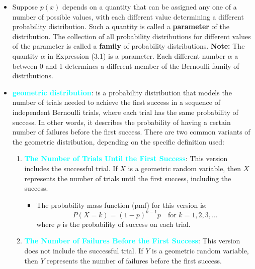 \documentclass{report}
\begin{document}
\begin{itemize}
    \item Suppose $p(x)$ depends on a quantity that can be assigned any one of a number
        of possible values, with each different value determining a different probability distribution. Such a quantity is called a \textbf{parameter} of the distribution. The
        collection of all probability distributions for different values of the parameter
        is called a \textbf{family} of probability distributions.
        \bigbreak \noindent 
        \textbf{Note:} The quantity $\alpha$ in Expression (3.1) is a parameter. Each different number $\alpha$ a between 0 and 1 determines a different member of the Bernoulli family of distributions.
    \item \textbf{\textcolor{cyan}{geometric distribution}}: is a probability distribution that models the number of trials needed to achieve the first success in a sequence of independent Bernoulli trials, where each trial has the same probability of success. In other words, it describes the probability of having a certain number of failures before the first success.
        \bigbreak \noindent 
        There are two common variants of the geometric distribution, depending on the specific definition used:
        \begin{enumerate}
            \item \textbf{\textcolor{cyan}{The Number of Trials Until the First Success}}: This version includes the successful trial. If \( X \) is a geometric random variable, then \( X \) represents the number of trials until the first success, including the success.

                \begin{itemize}
                    \item The probability mass function (pmf) for this version is:
                        \[
                            P(X = k) = (1 - p)^{k-1} p \quad \text{for } k = 1, 2, 3, \ldots
                        \]
                        where \( p \) is the probability of success on each trial.
                \end{itemize}

            \item \textbf{\textcolor{cyan}{The Number of Failures Before the First Success}}: This version does not include the successful trial. If \( Y \) is a geometric random variable, then \( Y \) represents the number of failures before the first success.


\end{enumerate}
\end{itemize}
\end{document}
